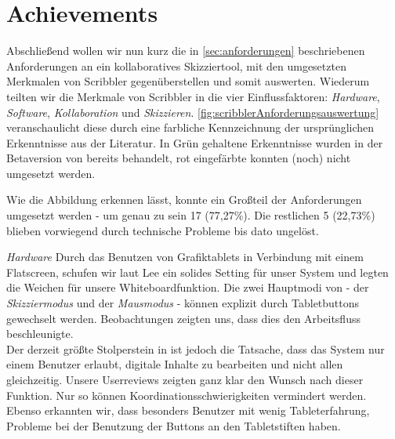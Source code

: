 \section{Achievements}
Abschließend wollen wir nun kurz die in \autoref{sec:anforderungen} beschriebenen Anforderungen an ein kollaboratives Skizziertool, mit den umgesetzten Merkmalen von Scribbler gegenüberstellen und somit auswerten. Wiederum teilten wir die Merkmale von Scribbler in die vier Einflussfaktoren: \emph{Hardware}, \emph{Software}, \emph{Kollaboration} und \emph{Skizzieren}.  \autoref{fig:scribblerAnforderungsauswertung} veranschaulicht diese durch eine farbliche Kennzeichnung der ursprünglichen Erkenntnisse aus der Literatur. In Grün gehaltene Erkenntnisse wurden in der Betaversion von \scribbler bereits behandelt, rot eingefärbte konnten (noch) nicht umgesetzt werden.

\medskip Wie die Abbildung erkennen lässt, konnte ein Großteil der Anforderungen umgesetzt werden - um genau zu sein 17 (77,27\%). Die restlichen 5 (22,73\%) blieben vorwiegend durch technische Probleme bis dato ungelöst.

\medskip \emph{Hardware} Durch das Benutzen von Grafiktablets in Verbindung mit einem Flatscreen, schufen wir laut Lee ein solides Setting für unser System und legten die Weichen für unsere Whiteboardfunktion. Die zwei Hauptmodi von \scribbler - der \emph{Skizziermodus} und der \emph{Mausmodus} - können explizit durch Tabletbuttons gewechselt werden. Beobachtungen zeigten uns, dass dies den Arbeitsfluss beschleunigte.\\
Der derzeit größte Stolperstein in \scribbler ist jedoch die Tatsache, dass das System nur einem Benutzer erlaubt, digitale Inhalte zu bearbeiten und nicht allen gleichzeitig. Unsere Userreviews zeigten ganz klar den Wunsch nach dieser Funktion. Nur so können Koordinationsschwierigkeiten vermindert werden. \\
Ebenso erkannten wir, dass besonders Benutzer mit wenig Tableterfahrung, Probleme bei der Benutzung der Buttons an den Tabletstiften haben.

